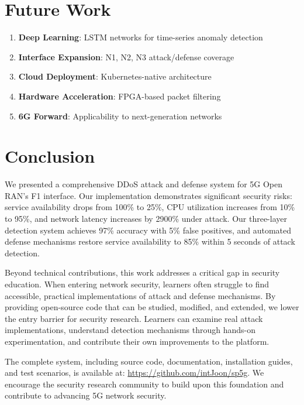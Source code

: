 \documentclass[conference]{IEEEtran}
\begin{document}
\section{Future Work}

\begin{enumerate}
    \item \textbf{Deep Learning}: LSTM networks for time-series anomaly detection
    \item \textbf{Interface Expansion}: N1, N2, N3 attack/defense coverage
    \item \textbf{Cloud Deployment}: Kubernetes-native architecture
    \item \textbf{Hardware Acceleration}: FPGA-based packet filtering
    \item \textbf{6G Forward}: Applicability to next-generation networks
\end{enumerate}

\section{Conclusion}

We presented a comprehensive DDoS attack and defense system for 5G Open RAN's F1 interface. Our implementation demonstrates significant security risks: service availability drops from 100\% to 25\%, CPU utilization increases from 10\% to 95\%, and network latency increases by 2900\% under attack. Our three-layer detection system achieves 97\% accuracy with 5\% false positives, and automated defense mechanisms restore service availability to 85\% within 5 seconds of attack detection.

Beyond technical contributions, this work addresses a critical gap in security education. When entering network security, learners often struggle to find accessible, practical implementations of attack and defense mechanisms. By providing open-source code that can be studied, modified, and extended, we lower the entry barrier for security research. Learners can examine real attack implementations, understand detection mechanisms through hands-on experimentation, and contribute their own improvements to the platform.

The complete system, including source code, documentation, installation guides, and test scenarios, is available at: \url{https://github.com/intJoon/sp5g}. We encourage the security research community to build upon this foundation and contribute to advancing 5G network security.
\end{document}
